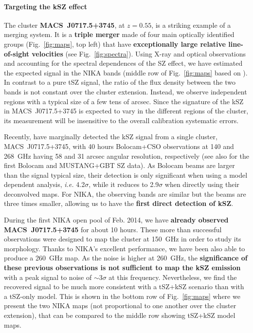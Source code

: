 \documentclass[11pt,a4paper,twoside,graphicx,color]{article}
\begin{document}
\paragraph{\large Targeting the kSZ effect}
The cluster \mbox{\bf MACS~J0717.5+3745}, at $z=0.55$, is a striking example of a merging system. It is a {\bf triple merger} made of four main optically identified groups (Fig.~\ref{fig:maps}, top left) that have {\bf exceptionally large relative line-of-sight velocities} (see Fig.~\ref{fig:spectra}). Using \mbox{X-ray} and optical observations and accounting for the spectral dependences of the SZ effect, we have estimated the expected signal in the NIKA bands (middle row of Fig.~\ref{fig:maps} based on \cite{ruppin2013}). In contrast to a pure tSZ signal, the ratio of the flux density between the two bands is not constant over the cluster extension. Instead, we observe independent regions with a typical size of a few tens of arcsec. Since the signature of the kSZ in \mbox{MACS~J0717.5+3745} is expected to vary in the different regions of the cluster, its measurement will be insensitive to the overall calibration systematic errors.

Recently, \cite{sayers2013} have marginally detected the kSZ signal from a single cluster, \mbox{MACS~J0717.5+3745}, with 40 hours Bolocam+CSO observations at 140 and 268~GHz having 58 and 31 arcsec angular resolution, respectively (see also \cite{mroczkowski2012} for the first Bolocam and MUSTANG+GBT SZ data). As Bolocam beams are larger than the signal typical size, their detection is only significant when using a model dependent analysis, {\it i.e.} 4.2$\sigma$, while it reduces to 2.9$\sigma$ when directly using their deconvolved maps. For NIKA, the observing bands are similar but the beams are three times smaller, allowing us to have the {\bf first direct detection of kSZ}.

During the first NIKA open pool of Feb. 2014, we have {\bf already observed {\mbox MACS~J0717.5+3745}} for about 10 hours. These more than successful observations were designed to map the cluster at 150~GHz in order to study its morphology. Thanks to NIKA's excellent performance, we have been also able to produce a 260~GHz map. As the noise is higher at 260~GHz, the {\bf significance of these previous observations is not sufficient to map the kSZ emission} with a peak signal to noise of $\sim 3\sigma$ at this frequency. Nevertheless, we find the recovered signal to be much more consistent with a tSZ+kSZ scenario than with a tSZ-only model. This is shown in the bottom row of Fig.~\ref{fig:maps} where we present the two NIKA maps (not proportional to one another over the cluster extension), that can be compared to the middle row showing tSZ+kSZ model maps.
\end{document}
